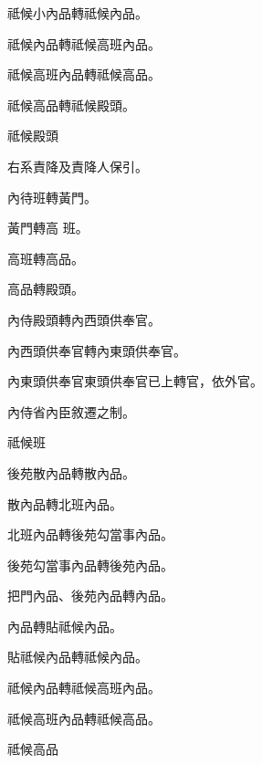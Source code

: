 \begin{pinyinscope}
 祗候小內品轉祗候內品。



 祗候內品轉祗候高班內品。



 祗候高班內品轉祗候高品。



 祗候高品轉祗候殿頭。



 祗候殿頭



 右系責降及責降人保引。



 內待班轉黃門。



 黃門轉高
 班。



 高班轉高品。



 高品轉殿頭。



 內侍殿頭轉內西頭供奉官。



 內西頭供奉官轉內東頭供奉官。



 內東頭供奉官東頭供奉官已上轉官，依外官。



 內侍省內臣敘遷之制。



 祗候班



 後苑散內品轉散內品。



 散內品轉北班內品。



 北班內品轉後苑勾當事內品。



 後苑勾當事內品轉後苑內品。



 把門內品、後苑內品轉內品。



 內品轉貼祗候內品。



 貼祗候內品轉祗候內品。



 祗候內品轉祗候高班內品。



 祗候高班內品轉祗候高品。



 祗候高品




\end{pinyinscope}
